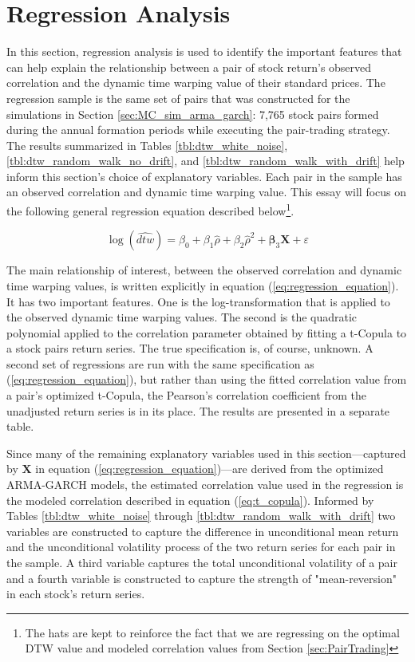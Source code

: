 \section{Regression Analysis} \label{sec:Regression_Analysis}

In this section, regression analysis is used to identify the important features that can help explain the relationship between a pair of stock return's observed correlation and the dynamic time warping value of their standard prices. The regression sample is the same set of pairs that was constructed for the simulations in Section \ref{sec:MC_sim_arma_garch}: 7,765 stock pairs formed during the annual formation periods while executing the pair-trading strategy. The results summarized in Tables \ref{tbl:dtw_white_noise}, \ref{tbl:dtw_random_walk_no_drift}, and \ref{tbl:dtw_random_walk_with_drift} help inform this section's choice of explanatory variables. Each pair in the sample has an observed correlation and dynamic time warping value. This essay will focus on the following general regression equation described below\footnote{The hats are kept to reinforce the fact that we are regressing on the optimal DTW value and modeled correlation values from Section \ref{sec:PairTrading}}.

\begin{equation} \label{eq:regression_equation}
    \log(\widehat{dtw}) = \beta_{0} + \beta_{1} \hat{\rho} + \beta_{2} \hat{\rho}^{2} + \boldsymbol{\beta}_{3} \boldsymbol{X} + \varepsilon
\end{equation}

The main relationship of interest, between the observed correlation and dynamic time warping values, is written explicitly in equation (\ref{eq:regression_equation}). It has two important features. One is the log-transformation that is applied to the observed dynamic time warping values. The second is the quadratic polynomial applied to the correlation parameter obtained by fitting a t-Copula to a stock pairs return series. The true specification is, of course, unknown. A second set of regressions are run with the same specification as (\ref{eq:regression_equation}), but rather than using the fitted correlation value from a pair's optimized t-Copula, the Pearson's correlation coefficient from the unadjusted return series is in its place. The results are presented in a separate table.

Since many of the remaining explanatory variables used in this section---captured by $\boldsymbol{X}$ in equation (\ref{eq:regression_equation})---are derived from the optimized ARMA-GARCH models, the estimated correlation value used in the regression is the modeled correlation described in equation (\ref{eq:t_copula}). Informed by Tables \ref{tbl:dtw_white_noise} through \ref{tbl:dtw_random_walk_with_drift} two variables are constructed to capture the difference in unconditional mean return and the unconditional volatility process of the two return series for each pair in the sample. A third variable captures the total unconditional volatility of a pair and a fourth variable is constructed to capture the strength of "mean-reversion" in each stock's return series.

